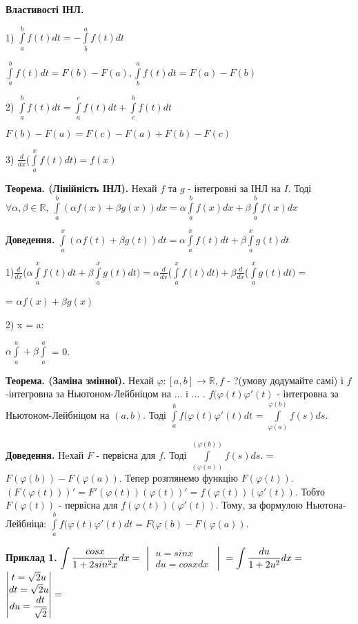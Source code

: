 \documentclass[12pt]{report}
\begin{document}
	\textbf{Властивості ІНЛ.}
	\vspace{1mm}
		
	1) $\int\limits_a^b f(t)dt = - \int\limits_b^a f(t)dt $
	
	$\int\limits_a^b f(t)dt = F(b) - F(a),  \int\limits_b^a f(t)dt = F(a) - F(b)$
	
	2) $\int\limits_a^b f(t)dt = \int\limits_a^c f(t)dt +  \int\limits_c^bf(t)dt $
	
	$ F(b) - F(a) =  F(c) - F(a) +  F(b) - F(c)$
	
	3) $\frac{d}{dx}$($\int\limits_a^xf(t)dt)  = f(x)$
	
	\textbf{Теорема. (Лінійність ІНЛ).} Нехай $f$ та $g$ - інтегровні за ІНЛ на $I$. Тоді 
	 $ \forall \alpha, \beta \in \mathbb{R}, \:  \int\limits_a^b  (\alpha f(x)+\beta g(x))dx =  \alpha\int\limits_a^b f(x)dx + \beta \int\limits_a^b f(x)dx $
	 
	\textbf{Доведення.}  $\int\limits_a^x  (\alpha f(t)+\beta g(t))dt = \alpha\int\limits_a^x f(t)dt + \beta \int\limits_a^x g(t)dt $
	
	1)$ \frac{d}{dx}$($\alpha\int\limits_a^xf(t)dt+\beta\int\limits_a^xg(t)dt)  = \alpha \frac{d}{dx}$($\int\limits_a^xf(t)dt) + \beta\frac{d}{dx}$($\int\limits_a^xg(t)dt) =$
	
	 = $\alpha f(x) +\beta g(x) $
	
    2) x = a:
    
   $\alpha\int\limits_a^a +\beta\int\limits_a^a$ = 0.
	
	\textbf{Теорема. (Заміна змінної).} 
	Нехай $\mathbb\varphi : [a,b] \to \mathbb{R}, f$ - ?(умову додумайте самі) і $f$-інтегровна за Ньютоном-Лейбніцом на ...  i ... . $f(\varphi(t)\varphi'(t)$ - інтегровна за Ньютоном-Лейбніцом на $(a,b)$. Тоді $\int\limits_a^ b f(\varphi(t)\varphi'(t)dt$ = $\int\limits_{\varphi(a)}^{\varphi(b)}f(s)ds.$
	
	\textbf{Доведення.} Heхай $F$ - первісна для $f$. Тоді  $\int\limits_(\varphi(a))^(\varphi(b))f(s)ds.$ = $F(\varphi(b)) - F(\varphi(a)). $
	Тепер розглянемо функцію $F(\varphi(t)).$ $(F(\varphi(t)))'= F'(\varphi(t))(\varphi(t))' = f(\varphi(t))(\varphi'(t)).$ Тобто $F(\varphi(t))$ - первісна для $f(\varphi(t))(\varphi'(t)).$
	Тому, за формулою Ньютона-Лейбніца: $\int\limits_a^ b f(\varphi(t)\varphi'(t)dt = F(\varphi(b)- F(\varphi(a))$.	
	
	\textbf{Приклад 1.}
	 $	\mathlarger{ \int\frac {cosx}{1+2sin^2x}dx} =   $ 
	$ \begin{vmatrix}
	 u = sinx \\
	 du = cosxdx\
	 \end{vmatrix}$	
	$ =	\mathlarger{ \int\limits\frac {du}{1+2u^2}dx} =   $ 
		$ \begin{vmatrix}
	t  = \sqrt{2}u \\
	dt = \sqrt{2}u\\
	du = 	\mathlarger{\frac{dt}{ \sqrt{2}} }
	\end{vmatrix}=$	
	
\end{document}
